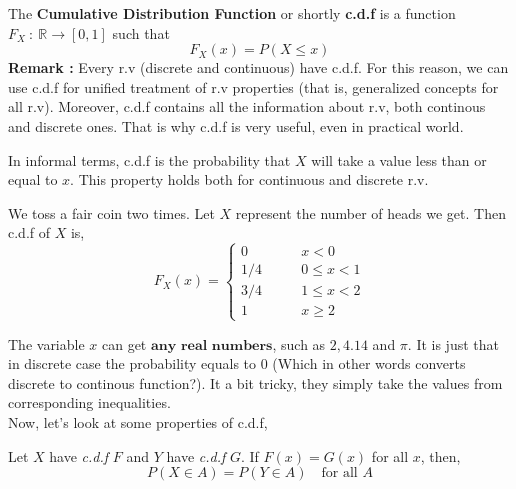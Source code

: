 \begin{definition}
    The \textbf{Cumulative Distribution Function} or shortly \textbf{c.d.f} is a function $F_X \ : \ \mathbb{R} \rightarrow [0,1]$ such that
    \[ F_X(x) = P( X \le x) \]
    \textbf{Remark :} Every r.v (discrete and continuous) have c.d.f. For this reason, we can use c.d.f for unified treatment of r.v properties (that is, generalized concepts for all r.v). Moreover, c.d.f contains all the information about r.v, both continous and discrete ones. That is why c.d.f is very useful, even in practical world.
\end{definition}
\par
In informal terms, c.d.f is the probability that $X$ will take a value less than or equal to $x$. This property holds both for continuous and discrete r.v.


\begin{example}
    We toss a fair coin two times. Let $X$ represent the number of heads we get. Then c.d.f of $X$ is,
    \[F_X(x) = 
        \begin{cases} 
          0 \qquad &x < 0\\
          1/4 \qquad &0 \le x <1 \\
          3/4 \qquad &1 \leq x < 2 \\
          1 \qquad &x \ge 2
        \end{cases} 
\]
\end{example}

The variable $x$ can get $\textbf{any real numbers}$, such as $2, 4.14$ and $\pi$. It is just that in discrete case the probability equals to $0$ (Which in other words converts discrete to continous function?). It a bit tricky, they simply take the values from corresponding inequalities.
\\
Now, let's look at some properties of c.d.f,
\begin{theorem}
    Let $X$ have \textit{c.d.f} $F$ and $Y$  have \textit{c.d.f} $G$. If $F(x)=G(x)$ for all $x$, then,
    \[ P(X \in A) = P(Y \in A) \quad \text{for all $A$} \] 
\end{theorem}


